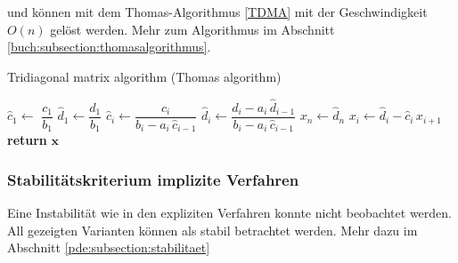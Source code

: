 	   und k\"onnen mit dem Thomas-Algorithmus \autoref{TDMA} \cite{burgers:thomas} mit der Geschwindigkeit $O(n)$ gel\"ost werden.
%
	   Mehr zum Algorithmus im Abschnitt \ref{buch:subsection:thomasalgorithmus}.

	\begin{algorithm}\caption{Tridiagonal matrix algorithm (Thomas algorithm)}\label{TDMA}
	  \setlength{\lineskip}{7pt}
	  \begin{algorithmic}[1]
	      \State $\hat c_1 \gets$ $ \dfrac{c_1}{b_1}$
	      \State $\hat d_1 \gets \dfrac{d_1}{b_1}$
	        \State $\hat c_i \gets \dfrac{c_i}{b_i-a_i \, \hat c_{i-1}}$
	      \EndFor
	        \State $\hat d_i \gets \dfrac{d_i - a_i \, \hat d_{i-1}}{b_i-a_i \, \hat c_{i-1}}$
	      \EndFor
	      \State $x_n \gets \hat d_n$
	        \State $x_i \gets \hat d_i - \hat c_i \, x_{i+1}$
	      \EndFor
	      \State \textbf{return} $\textbf{x}$
	    \EndFunction
	  \end{algorithmic}
	\end{algorithm}

	\subsubsection{Stabilit\"atskriterium implizite Verfahren}

	Eine Instabilit\"at wie in den expliziten Verfahren konnte nicht beobachtet werden.
	All gezeigten Varianten k\"onnen als stabil betrachtet werden.
	Mehr dazu im Abschnitt \ref{pde:subsection:stabilitaet}
